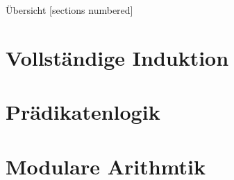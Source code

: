 %
%
%
%



\renewcommand\daynr{3}




\maketitle

\begin{frame}[fragile]{Übersicht}
  [sections numbered]
  \tableofcontents%
\end{frame}

\section{Vollständige Induktion}







\section{Prädikatenlogik}



\section{Modulare Arithmtik}



